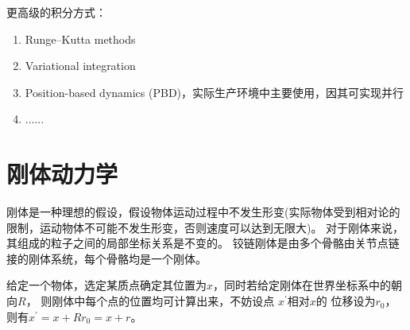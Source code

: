 \documentclass[lang=cn,newtx,10pt,scheme=chinese]{elegantbook}
\begin{document}
更高级的积分方式：
\begin{enumerate}
  \setlength{\itemindent}{2em}
  \item Runge–Kutta methods
  \item  Variational integration
  \item Position-based dynamics (PBD)，实际生产环境中主要使用，因其可实现并行
  \item ......
\end{enumerate}

\section{刚体动力学}
刚体是一种理想的假设，假设物体运动过程中不发生形变(实际物体受到相对论的限制，运动物体不可能不发生形变，否则速度可以达到无限大)。
对于刚体来说，其组成的粒子之间的局部坐标关系是不变的。
铰链刚体是由多个骨骼由关节点链接的刚体系统，每个骨骼均是一个刚体。

给定一个物体，选定某质点确定其位置为$x$，同时若给定刚体在世界坐标系中的朝向$R$，
则刚体中每个点的位置均可计算出来，不妨设点 $x^\prime$相对$x$的
位移设为$r_0$，则有$x^{\prime} = x + R r_0 = x + r$。
\end{document}
